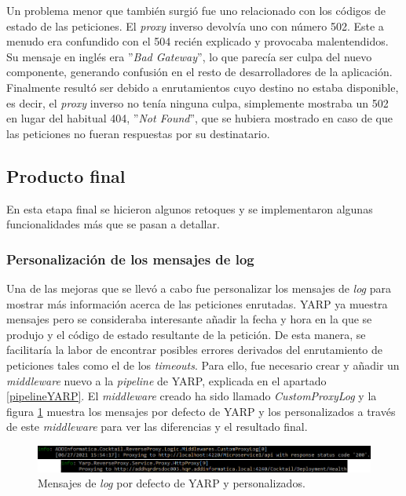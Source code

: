 \documentclass[11pt,spanish,listoffigures]{tfgetsinf}
\begin{document}
Un problema menor que también surgió fue uno relacionado con los códigos de estado de las peticiones. El \emph{proxy} inverso devolvía uno con número 502. Este a menudo era confundido con el 504 recién explicado y provocaba malentendidos. Su mensaje en inglés era ''\emph{Bad Gateway}'', lo que parecía ser culpa del nuevo componente, generando confusión en el resto de desarrolladores de la aplicación. Finalmente resultó ser debido a enrutamientos cuyo destino no estaba disponible, es decir, el \emph{proxy} inverso no tenía ninguna culpa, simplemente mostraba un 502 en lugar del habitual 404, ''\emph{Not Found}'', que se hubiera mostrado en caso de que las peticiones no fueran respuestas por su destinatario.


		\subsection{Producto final}

En esta etapa final se hicieron algunos retoques y se implementaron algunas funcionalidades más que se pasan a detallar.


			\subsubsection{Personalización de los mensajes de log}

Una de las mejoras que se llevó a cabo fue personalizar los mensajes de \emph{log} para mostrar más información acerca de las peticiones enrutadas. YARP ya muestra mensajes pero se consideraba interesante añadir la fecha y hora en la que se produjo y el código de estado resultante de la petición. De esta manera, se facilitaría la labor de encontrar posibles errores derivados del enrutamiento de peticiones tales como el de los \emph{timeouts}. Para ello, fue necesario crear y añadir un \emph{middleware} nuevo a la \emph{pipeline} de YARP, explicada en el apartado \ref{pipelineYARP}. El \emph{middleware} creado ha sido llamado \emph{CustomProxyLog} y la figura \ref{logs} muestra los mensajes por defecto de YARP y los personalizados a través de este \emph{middleware} para ver las diferencias y el resultado final.

\begin{figure}[ht]
\centering
\includegraphics[width=1\textwidth]{imagenes/logs}
\caption{Mensajes de \emph{log} por defecto de YARP y personalizados.}
	\label{logs}
\end{figure}
\end{document}
